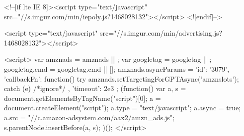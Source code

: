     <!--[if lte IE 8]><script type="text/javascript" src="//s.imgur.com/min/iepoly.js?1468028132"></script>
<![endif]-->
    

                        <script type="text/javascript" src="//s.imgur.com/min/advertising.js?1468028132"></script>

<script>
    var amznads = amznads || { };
    var googletag = googletag || { };
    googletag.cmd = googletag.cmd || [];
    amznads.asyncParams = {
        'id': '3079',
        'callbackFn': function() {
            try {
                amznads.setTargetingForGPTAsync('amznslots');
            } catch (e) { /*ignore*/ }
        },
        'timeout': 2e3
    };
    (function() {
        var a, s = document.getElementsByTagName("script")[0];
        a = document.createElement("script");
        a.type = "text/javascript";
        a.async = true;
        a.src = "//c.amazon-adsystem.com/aax2/amzn_ads.js";
        s.parentNode.insertBefore(a, s);
    })();
</script>

